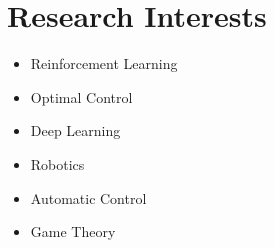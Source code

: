 \documentclass[letterpaper,11pt]{article}
\newcommand{\resumeSubHeadingListEnd}{\end{itemize}}
\begin{document}
 \vspace{-16pt}
\section{Research Interests}
        \begin{multicols}{3}
          {\normalsize   
            \begin{itemize}[itemsep=-2pt, parsep=3pt]
                \item Reinforcement Learning
                \item Optimal Control
                \item Deep Learning
                \item Robotics
                \item Automatic Control
                \item Game Theory
            \end{itemize}}
        \end{multicols}
        \vspace*{3.0\multicolsep}

\vspace{4pt}
\end{document}
